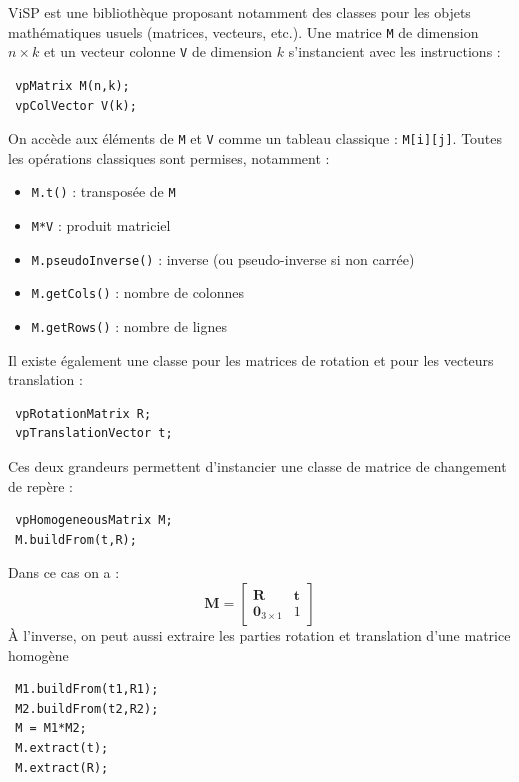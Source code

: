 \documentclass[12pt,a4paper]{article}
\begin{document}
ViSP est une bibliothèque proposant notamment des classes pour les objets mathématiques usuels (matrices, vecteurs, etc.).
Une matrice \texttt{M} de dimension $n\times k$ et un vecteur colonne \texttt{V} de dimension $k$ s'instancient avec les instructions :
\begin{verbatim}
 vpMatrix M(n,k);
 vpColVector V(k);
\end{verbatim}
On accède aux éléments de \texttt{M} et \texttt{V} comme un tableau classique : \texttt{M[i][j]}.
Toutes les opérations classiques sont permises, notamment :
\begin{itemize}
 \item \texttt{M.t()} : transposée de \texttt{M}
 \item \texttt{M*V} : produit matriciel
 \item \texttt{M.pseudoInverse()} : inverse (ou pseudo-inverse si non carrée)
 \item \texttt{M.getCols()} : nombre de colonnes
 \item \texttt{M.getRows()} : nombre de lignes
\end{itemize}
Il existe également une classe pour les matrices de rotation et pour les vecteurs translation :
\begin{verbatim}
 vpRotationMatrix R;
 vpTranslationVector t;
\end{verbatim}
Ces deux grandeurs permettent d'instancier une classe de matrice de changement de repère :
\begin{verbatim}
 vpHomogeneousMatrix M;
 M.buildFrom(t,R);
\end{verbatim}Dans ce cas on a :
\begin{equation*}
 \mathbf{M} = \left[\begin{array}{cc}
                     \mathbf{R} & \mathbf{t} \\ \mathbf{0}_{3\times 1} & 1
                    \end{array}\right]
\end{equation*}
À l'inverse, on peut aussi extraire les parties rotation et translation d'une matrice homogène
\begin{verbatim}
 M1.buildFrom(t1,R1);
 M2.buildFrom(t2,R2);
 M = M1*M2;
 M.extract(t);
 M.extract(R);
\end{verbatim}
\end{document}
